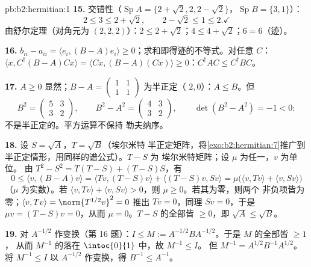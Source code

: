 \begin{solution}{pb:b2:hermitian:1}
\textbf{15.} 交错性（$\operatorname{Sp}A = \{2+\sqrt2, 2,
2-\sqrt2\}$，$\operatorname{Sp}B = \{3, 1\}$）：
\[
2 \leq 3 \leq 2 + \sqrt2,
\qquad
2 - \sqrt2 \leq 1 \leq 2 . \checkmark
\]
由舒尔定理（对角元为 $(2,2,2)$）：$2 \leq 2+\sqrt2$；$4 \leq 4 +
\sqrt2$；$6 = 6$（迹）。\checkmark

\textbf{16.} $b_{ii} - a_{ii} = \langle e_i, (B-A)e_i\rangle
\geq 0$；求和即得迹的不等式。对任意 $C$：$\langle x,
C^\dagger(B - A)Cx\rangle = \langle Cx, (B-A)(Cx)\rangle \geq
0$：$C^\dagger AC \leq C^\dagger BC$。

\textbf{17.} $A \geq 0$ 显然；$B - A = \begin{pmatrix} 1 & 1\\
1 & 1\end{pmatrix}$ 为半正定（ $2,
0$）：$A \leq B$。但
\[
B^2 = \begin{pmatrix} 5 & 3\\ 3 & 2\end{pmatrix},
\qquad
B^2 - A^2 = \begin{pmatrix} 4 & 3\\ 3 & 2\end{pmatrix},
\qquad \det(B^2 - A^2) = -1 < 0 :
\]
不是半正定的。平方运算不保持
勒夫纳序。

\textbf{18.} 设 $S = \sqrt A$，$T = \sqrt B$（埃尔米特
半正定矩阵，将\cref{exo:b2:hermitian:7}推广到
半正定情形，用同样的谱公式）。$T - S$ 为
埃尔米特矩阵；设 $\mu$ 为任一，$v$ 为单位。
由 $T^2 - S^2 = T(T - S) + (T - S)S$，有
\[
0 \leq \langle v, (B - A)v\rangle
= \langle Tv, (T-S)v\rangle + \langle (T-S)v, Sv\rangle
= \mu\bigl(\langle v, Tv\rangle + \langle v,
Sv\rangle\bigr)
\]
（$\mu$ 为实数）。若 $\langle v, Tv\rangle + \langle v,
Sv\rangle > 0$，则 $\mu \geq 0$。若其为零，则两个
非负项皆为零；$\langle v, Tv\rangle =
\norm{T^{1/2}v}^2 = 0$ 推出 $Tv = 0$，同理 $Sv = 0$，于是
$\mu v = (T - S)v = 0$，从而 $\mu = 0$。$T -
S$ 的全部皆 $\geq 0$，即 $\sqrt A \leq \sqrt B$。

\textbf{19.} 对 $A^{-1/2}$ 作变换（第 16 题）：$I \leq M
:= A^{-1/2}BA^{-1/2}$。于是 $M$ 的全部皆 $\geq 1$，
从而 $M^{-1}$ 的落在 $\intoc{0}{1}$ 中，故 $M^{-1} \leq I$。
但 $M^{-1} = A^{1/2}B^{-1}A^{1/2}$。将 $M^{-1} \leq
I$ 以 $A^{-1/2}$ 作变换，得 $B^{-1} \leq A^{-1}$。


\end{solution}
